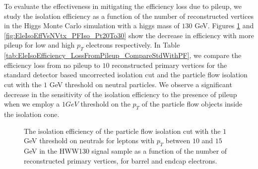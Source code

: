 To evaluate the effectiveness in mitigating the efficiency loss due to pileup, we study the isolation
efficiency as a function of the number of reconstructed vertices in the Higgs Monte Carlo simulation with a higgs 
mass of $130$ GeV. Figures \ref{fig:EleIsoEffVsNVtx_PFIso_Pt10To15} and \ref{fig:EleIsoEffVsNVtx_PFIso_Pt20To30}
show the decrease in efficiency with more pileup for low and high $p_{T}$ electrons respectively. In Table 
\ref{tab:EleIsoEfficiency_LossFromPileup_CompareStdWithPF}, we compare the efficiency loss from no pileup 
to $10$ reconstructed primary vertices for the standard detector based uncorrected isolation cut and the 
particle flow isolation cut with the $1$ GeV threshold on neutral particles. We observe a significant decrease
in the sensitivity of the isolation efficiency to the presence of pileup when we employ a $1GeV$ threshold on
the $p_{T}$ of the particle flow objects inside the isolation cone.

\begin{figure}[!htbp]
\begin{center}
\caption{The isolation efficiency of the particle flow isolation cut with the $1$GeV threshold on neutrals
for leptons with $p_{T}$ between $10$ and $15$ GeV in the HWW130 signal sample as a function of the 
number of reconstructed primary vertices, for barrel and endcap electrons.  }
\label{fig:EleIsoEffVsNVtx_PFIso_Pt10To15}
\end{center}
\end{figure}

